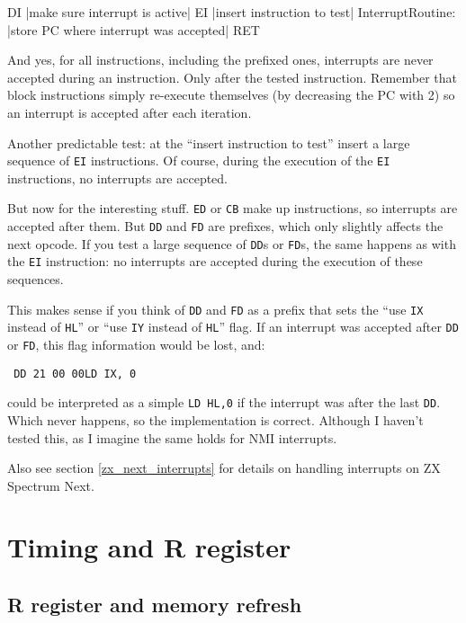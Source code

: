 \begin{tcblisting}{}
	DI
	|make sure interrupt is active|
	EI
	|insert instruction to test|
InterruptRoutine:
	|store PC where interrupt was accepted|
	RET
\end{tcblisting}

And yes, for all instructions, including the prefixed ones, interrupts are never accepted during an instruction. Only after the tested instruction. Remember that block instructions simply re-execute themselves (by decreasing the PC with 2) so an interrupt is accepted after each iteration.

Another predictable test: at the ``insert instruction to test'' insert a large sequence of {\tt EI} instructions. Of course, during the execution of the {\tt EI} instructions, no interrupts are accepted. 

\pagebreak %
But now for the interesting stuff. {\tt ED} or {\tt CB} make up instructions, so interrupts are accepted after them. But {\tt DD} and {\tt FD} are prefixes, which only slightly affects the next opcode. If you test a large sequence of {\tt DD}s or {\tt FD}s, the same happens as with the {\tt EI} instruction: no interrupts are accepted during the execution of these sequences.

This makes sense if you think of {\tt DD} and {\tt FD} as a prefix that sets the ``use {\tt IX} instead of {\tt HL}'' or ``use {\tt IY} instead of {\tt HL}'' flag. If an interrupt was accepted after {\tt DD} or {\tt FD}, this flag information would be lost, and:

{\tt 
	{\qquad}DD 21 00 00{\qquad}LD IX, 0
}

could be interpreted as a simple {\tt LD HL,0} if the interrupt was after the last {\tt DD}. Which never happens, so the implementation is correct. Although I haven't tested this, as I imagine the same holds for NMI interrupts.

Also see section \ref{zx_next_interrupts} for details on handling interrupts on ZX Spectrum Next.


\section{Timing and R register}

\subsection{R register and memory refresh}

